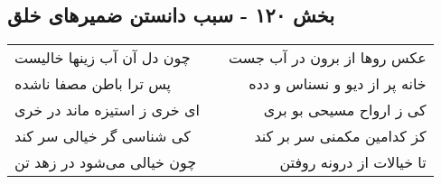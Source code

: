 \begin{center}
\section*{بخش ۱۲۰ - سبب دانستن ضمیرهای خلق}
\label{sec:sh120}
\begin{longtable}{l p{0.5cm} r}
چون دل آن آب زینها خالیست
&&
عکس روها از برون در آب جست
\\
پس ترا باطن مصفا ناشده
&&
خانه پر از دیو و نسناس و دده
\\
ای خری ز استیزه ماند در خری
&&
کی ز ارواح مسیحی بو بری
\\
کی شناسی گر خیالی سر کند
&&
کز کدامین مکمنی سر بر کند
\\
چون خیالی می‌شود در زهد تن
&&
تا خیالات از درونه روفتن
\\
\end{longtable}
\end{center}
